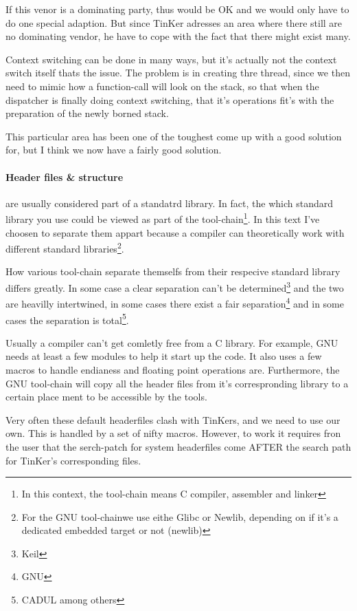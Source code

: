 If this venor is a dominating party, thus would be OK and we would only have to do one special adaption. But since TinKer adresses an area where there still are no dominating vendor, he have to cope with the fact that there might exist many.

Context switching can be done in many ways, but it's actually not the context switch itself thats the issue. The problem is in creating thre thread, since we then need to mimic how a function-call will look on the stack, so that when the dispatcher is finally doing context switching, that it's operations fit's with the preparation of the newly borned stack.

This particular area has been one of the toughest come up with a good solution for, but I think we now have a fairly good solution.

\paragraph{Header files \& structure} are usually considered part of a standatrd library. In fact, the which standard library you use could be viewed as part of the tool-chain\footnote{In this context, the tool-chain means C compiler, assembler and linker}. In this text I've choosen to separate them appart because a compiler can theoretically work with different standard libraries\footnote{For the GNU tool-chainwe use eithe Glibc or Newlib, depending on if it's a dedicated embedded target or not (newlib)}.

How various tool-chain separate themselfs from their respecive standard library differs greatly. In some case a clear separation can't be determined\footnote{Keil} and the two are heavilly intertwined, in some cases there exist a fair separation\footnote{GNU} and in some cases the separation is total\footnote{CADUL among others}.

Usually a compiler can't get comletly free from a C library. For example, GNU needs at least a few modules to help it start up the code. It also uses a few macros to handle endianess and floating point operations are. Furthermore, the GNU tool-chain will copy all the header files from it's correspronding library to a certain place ment to be accessible by the tools.

Very often these default headerfiles clash with TinKers, and we need to use our own. This is handled by a set of nifty macros. However, to work it requires fron the user that the serch-patch for system headerfiles come AFTER the search path for TinKer's corresponding files. 

